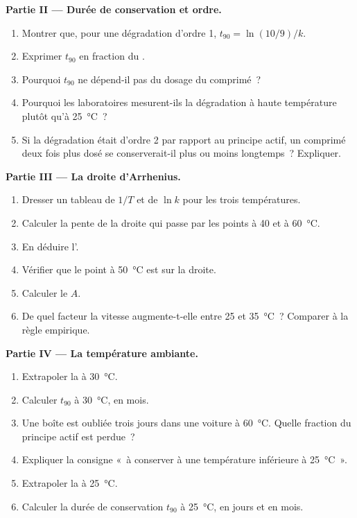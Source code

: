 \begin{problem}
\medskip
\noindent\textbf{Partie II --- Durée de conservation et ordre.}
\begin{enumerate}[resume]
  \item Montrer que, pour une dégradation d'ordre 1, $t_{90} = \ln(10/9)/k$.
  \item Exprimer $t_{90}$ en fraction du .
  \item Pourquoi $t_{90}$ ne dépend-il pas du dosage du comprimé~?
  \item Pourquoi les laboratoires mesurent-ils la dégradation à haute
        température plutôt qu'à \qty{25}{\celsius}~?
  \item Si la dégradation était d'ordre 2 par rapport au principe actif,
        un comprimé deux fois plus dosé se conserverait-il plus ou moins
        longtemps~? Expliquer.
\end{enumerate}

\medskip
\noindent\textbf{Partie III --- La droite d'Arrhenius.}
\begin{enumerate}[resume]
  \item Dresser un tableau de $1/T$ et de $\ln k$ pour les trois
        températures.
  \item Calculer la pente de la droite qui passe par les points à 40 et
        à \qty{60}{\celsius}.
  \item En déduire l'.
  \item Vérifier que le point à \qty{50}{\celsius} est sur la droite.
  \item Calculer le  $A$.
  \item De quel facteur la vitesse augmente-t-elle entre 25 et
        \qty{35}{\celsius}~? Comparer à la règle empirique.
\end{enumerate}

\medskip
\noindent\textbf{Partie IV --- La température ambiante.}
\begin{enumerate}[resume]
  \item Extrapoler la  à \qty{30}{\celsius}.
  \item Calculer $t_{90}$ à \qty{30}{\celsius}, en mois.
  \item Une boîte est oubliée trois jours dans une voiture à
        \qty{60}{\celsius}. Quelle fraction du principe actif est perdue~?
  \item Expliquer la consigne «~à conserver à une température inférieure
        à \qty{25}{\celsius}~».
  \item Extrapoler la  à \qty{25}{\celsius}.
  \item Calculer la durée de conservation $t_{90}$ à \qty{25}{\celsius},
        en jours et en mois.
\end{enumerate}
\end{problem}

